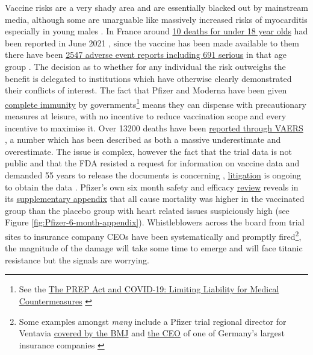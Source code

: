 \documentclass[11pt,a4paper,notitlepage]{report}
\begin{document}

Vaccine risks are a very shady area and are essentially blacked out by mainstream media, although some are unarguable like massively increased risks of myocarditis especially in young males \cite{10.1001/jama.2021.24110}. In France around \href{https://www.liberation.fr/checknews/combien-de-moins-de-18-ans-sans-comorbidite-sont-morts-du-covid-19-20210702_MGGZB2ZKPNHAPI3UJNNLLKZRFE/}{10 deaths for under 18 year olds} had been reported in June 2021 \cite{liberation02072021}, since the vaccine has been made available to them there have been \href{https://ansm.sante.fr/uploads/2022/02/04/20220207-covid-19-vaccins-fiche-synthese.pdf}{2547 adverse event reports including 691 serious} in that age group \cite{ansm04022022}. The decision as to whether for any individual the risk outweighs the benefit is delegated to institutions which have otherwise clearly demonstrated their conflicts of interest. The fact that Pfizer and Moderna have been given \href{https://www.cnbc.com/2020/12/16/covid-vaccine-side-effects-compensation-lawsuit.html}{complete immunity} \cite{cnbc17122020} by governments\footnote{See the \href{https://crsreports.congress.gov/product/pdf/LSB/LSB10443}{The PREP Act and COVID-19: Limiting Liability for Medical Countermeasures} \cite{cnsreports13012022}} means they can dispense with precautionary measures at leisure, with no incentive to reduce vaccination scope and every incentive to maximise it. Over 13200 deaths have been \href{https://www.cdc.gov/coronavirus/2019-ncov/vaccines/safety/adverse-events.html}{reported through VAERS} \cite{cdc14032022}, a number which has been described as both a massive underestimate and overestimate. The issue is complex, however the fact that the trial data is not public and that the FDA resisted a request for information on vaccine data and demanded 55 years to release the documents is concerning \cite{mailonline19112021}, \href{https://phmpt.org/}{litigation} is ongoing to obtain the data \cite{phmpt}. Pfizer's own six month safety and efficacy \href{https://www.nejm.org/doi/full/10.1056/NEJMoa2110345}{review} \cite{doi:10.1056/NEJMoa2110345} reveals in its \href{https://www.nejm.org/doi/suppl/10.1056/NEJMoa2110345/suppl_file/nejmoa2110345_appendix.pdf}{supplementary appendix} \cite{doi:10.1056/NEJMoa2110345-appendix} that all cause mortality was higher in the vaccinated group than the placebo group with heart related issues suspiciously high (see Figure \ref{fig:Pfizer-6-month-appendix}). Whistleblowers across the board from trial sites to insurance company CEOs have been systematically and promptly fired\footnote{Some examples amongst \textit{many} include a Pfizer trial regional director for Ventavia \href{https://www.bmj.com/content/375/bmj.n2635}{covered by the BMJ} \cite{bmj02112021} and \href{https://childrenshealthdefense.org/defender/german-insurance-fires-andreas-schofbeck-covid-vaccine-injuries-data/}{the CEO} of one of Germany's largest insurance companies \cite{defender140322}}, the magnitude of the damage will take some time to emerge and will face titanic resistance but the signals are worrying.
\end{document}
